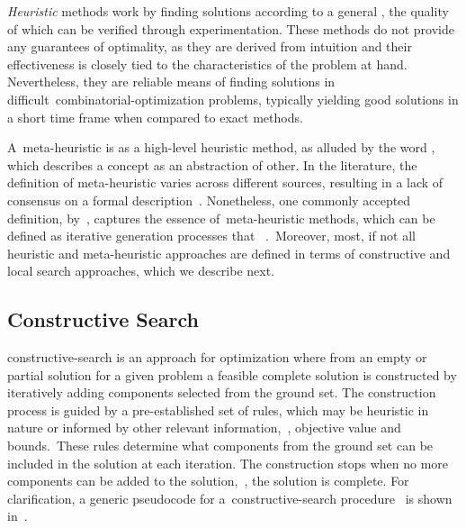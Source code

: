 \emph{Heuristic} methods work by finding solutions according to a general
, the quality of which can be verified through
experimentation. These methods do not provide any guarantees of optimality, as
they are derived from intuition and their effectiveness is closely tied to the
characteristics of the problem at hand. Nevertheless, they are reliable means of
finding solutions in difficult~\acrshort{combinatorial-optimization} problems,
typically yielding good solutions in a short time frame when compared to exact
methods.

A~\acrshort{meta-heuristic} is as a high-level heuristic method,
as alluded by the word , which describes a concept as an
abstraction of other. In the literature, the definition of meta-heuristic varies
across different sources, resulting in a lack of consensus on a formal
description~\cite{osman1996metaheuristics,blum2003metaheuristics,festa2014brief,luke2013essentialsa}.
Nonetheless, one commonly accepted definition,
by~\citet{osman1996metaheuristics}, captures the essence
of~\acrshort{meta-heuristic} methods, which can be defined as iterative
generation processes that~\emph{
}.~Moreover, most, if not all heuristic and meta-heuristic approaches are defined
in terms of constructive and local search approaches, which we describe next.

\subsection{Constructive Search}
\label{subsec:contructive-search}

\acrfull{constructive-search} is an approach for optimization where from an
empty or partial solution for a given problem a feasible complete solution is
constructed by iteratively adding components selected from the ground set. The
construction process is guided by a pre-established set of rules, which may be
heuristic in nature or informed by other relevant information,~\eg{}, objective
value and bounds.~These rules determine what components from the ground set can
be included in the solution at each iteration. The construction stops when no
more components can be added to the solution,~\ie{}, the solution is complete.
For clarification, a generic pseudocode for a~\acrshort{constructive-search}
procedure~\cite{marti2013multistart} is shown in~.

